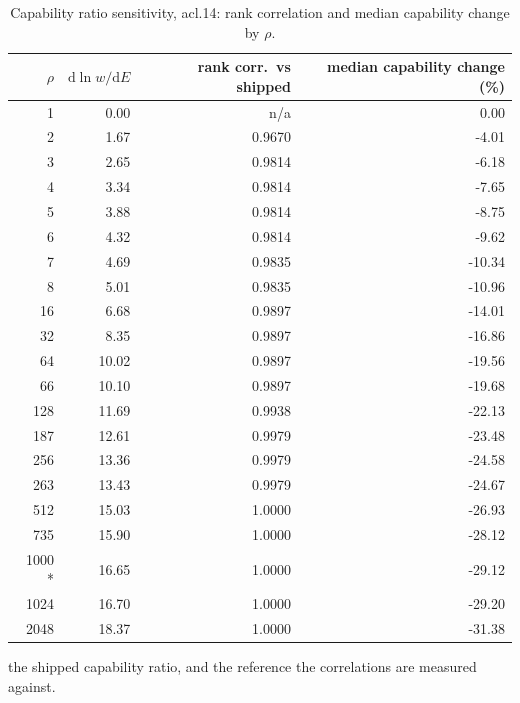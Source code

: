 \begin{table}[htbp]
  \centering
  \caption{Capability ratio sensitivity, acl.14: rank correlation and median capability change by $\rho$.}
  \label{tab:rho-acl-14-summary}
  \begin{tabular}{r r r r}
    \toprule
    $\rho$ & $\mathrm{d}\ln w/\mathrm{d}E$ & rank corr.\ vs shipped & median capability change (\%) \\
    \midrule
    1 & 0.00 & n/a & 0.00 \\
    2 & 1.67 & 0.9670 & -4.01 \\
    3 & 2.65 & 0.9814 & -6.18 \\
    4 & 3.34 & 0.9814 & -7.65 \\
    5 & 3.88 & 0.9814 & -8.75 \\
    6 & 4.32 & 0.9814 & -9.62 \\
    7 & 4.69 & 0.9835 & -10.34 \\
    8 & 5.01 & 0.9835 & -10.96 \\
    16 & 6.68 & 0.9897 & -14.01 \\
    32 & 8.35 & 0.9897 & -16.86 \\
    64 & 10.02 & 0.9897 & -19.56 \\
    66 & 10.10 & 0.9897 & -19.68 \\
    128 & 11.69 & 0.9938 & -22.13 \\
    187 & 12.61 & 0.9979 & -23.48 \\
    256 & 13.36 & 0.9979 & -24.58 \\
    263 & 13.43 & 0.9979 & -24.67 \\
    512 & 15.03 & 1.0000 & -26.93 \\
    735 & 15.90 & 1.0000 & -28.12 \\
    1000 * & 16.65 & 1.0000 & -29.12 \\
    1024 & 16.70 & 1.0000 & -29.20 \\
    2048 & 18.37 & 1.0000 & -31.38 \\
    \bottomrule
  \end{tabular}
  \par\smallskip\footnotesize * the shipped capability ratio, and the reference the correlations are measured against.
\end{table}
